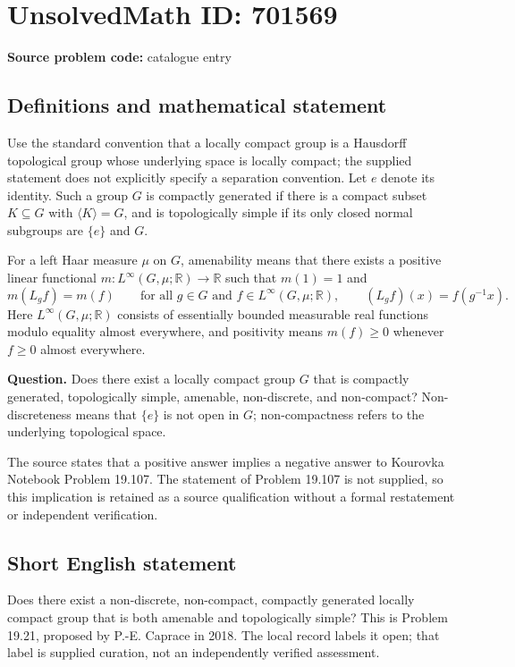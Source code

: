 \documentclass[11pt]{article}
\newcommand{\R}{\mathbb{R}}
\begin{document}
\section*{UnsolvedMath ID: 701569}
\textbf{Source problem code:} catalogue entry
\subsection{Definitions and mathematical statement}
Use the standard convention that a locally compact group is a Hausdorff topological group whose underlying space is locally compact; the supplied statement does not explicitly specify a separation convention. Let \(e\) denote its identity. Such a group \(G\) is compactly generated if there is a compact subset \(K\subseteq G\) with \(\langle K\rangle=G\), and is topologically simple if its only closed normal subgroups are \(\{e\}\) and \(G\).

For a left Haar measure \(\mu\) on \(G\), amenability means that there exists a positive linear functional \(m:L^\infty(G,\mu;\R)\to\R\) such that \(m(1)=1\) and
\[
 m(L_g f)=m(f)\qquad\text{for all }g\in G\text{ and }f\in L^\infty(G,\mu;\R),
 \qquad (L_g f)(x)=f(g^{-1}x).
\]
Here \(L^\infty(G,\mu;\R)\) consists of essentially bounded measurable real functions modulo equality almost everywhere, and positivity means \(m(f)\geq0\) whenever \(f\geq0\) almost everywhere.

\textbf{Question.} Does there exist a locally compact group \(G\) that is compactly generated, topologically simple, amenable, non-discrete, and non-compact? Non-discreteness means that \(\{e\}\) is not open in \(G\); non-compactness refers to the underlying topological space.

The source states that a positive answer implies a negative answer to Kourovka Notebook Problem 19.107. The statement of Problem 19.107 is not supplied, so this implication is retained as a source qualification without a formal restatement or independent verification.
\subsection{Short English statement}
Does there exist a non-discrete, non-compact, compactly generated locally compact group that is both amenable and topologically simple? This is Problem 19.21, proposed by P.-E. Caprace in 2018. The local record labels it open; that label is supplied curation, not an independently verified assessment.
\end{document}
